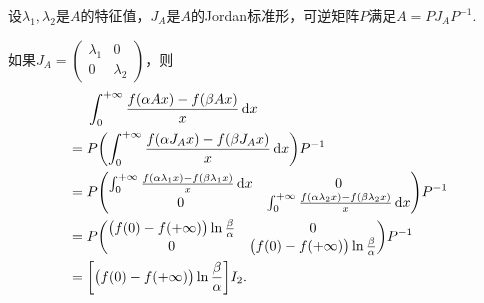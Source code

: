 \begin{solution}
  \begin{inparaenum}[(a)]
    \item 设$\lambda_1,\lambda_2$是$A$的特征值，$J_A$是$A$的Jordan标准形，可逆矩阵$P$满足$A=PJ_AP^{-1}$.

        如果$J_A=\begin{pmatrix}
         \lambda_1 & 0 \\
         0 & \lambda_2
        \end{pmatrix}$，则
        \begin{align*}
              & \int_0^{+\infty} \frac{f(\alpha Ax)-f(\beta Ax)}x \dif x \\
          = {}&
          P \left( \int_0^{+\infty} \frac{f(\alpha J_Ax)-f(\beta J_Ax)}x \dif x  \right) P^{-1} \\
          = {}& P \begin{pmatrix}
            \int_0^{+\infty} \frac{f(\alpha \lambda_1 x)-f(\beta \lambda_1 x)} x\dif x & 0 \\
            0 & \int_0^{+\infty} \frac{f(\alpha \lambda_2 x)-f(\beta \lambda_2 x)} x \dif x
          \end{pmatrix} P^{-1} \\
          = {}& P \begin{pmatrix}
            \big( f(0) - f(+\infty) \big)\ln\frac\beta\alpha & 0 \\
            0 & \big( f(0) - f(+\infty) \big)\ln\frac\beta\alpha
          \end{pmatrix} P^{-1} \\
          = {}& \left[  \big(f(0)-f(+\infty)\big)\ln\frac\beta\alpha \right]I_2.
        \end{align*}


\end{inparaenum}
\end{solution}
